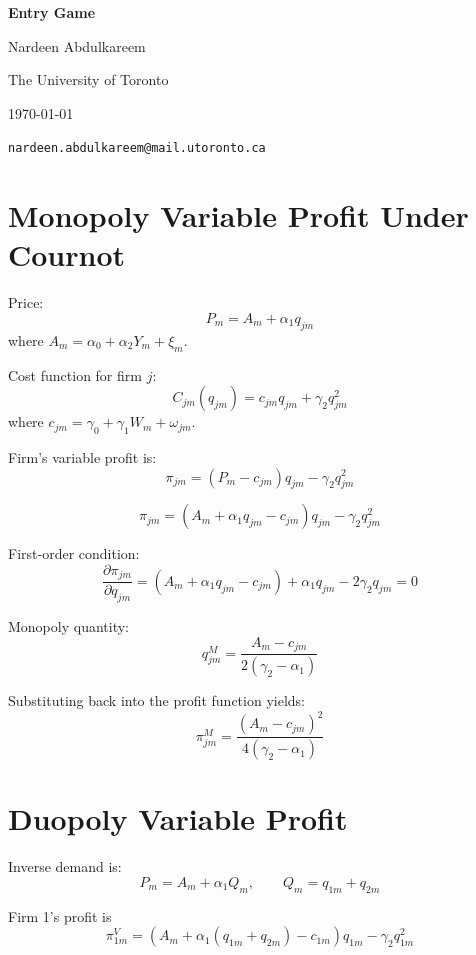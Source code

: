 \documentclass[12pt]{article}
\begin{document}
\begin{titlepage}
    \thispagestyle{empty} %
    \centering
    \vspace*{\fill}

    {\Large \textbf{Entry Game} \par}

    \vspace{3em}
    {\large Nardeen Abdulkareem \par}
    {\normalsize The University of Toronto \par}
    {\normalsize \today \par}
    {\texttt{nardeen.abdulkareem@mail.utoronto.ca} \par}

    \vspace*{\fill}
\end{titlepage}
\clearpage

\section{Monopoly Variable Profit Under Cournot}
Price:
\[
P_m = A_m + \alpha_1 q_{jm}
\]
where $A_m = \alpha_0 + \alpha_2 Y_m + \xi_m$.

Cost function for firm $j$:
\[
C_{jm}(q_{jm}) = c_{jm} q_{jm} + \gamma_2 q_{jm}^2
\]
where $c_{jm} = \gamma_0 + \gamma_1 W_m + \omega_{jm}$.

Firm’s variable profit is:
\[
\pi_{jm} = (P_m - c_{jm}) q_{jm} - \gamma_2 q_{jm}^2
\]

\[
\pi_{jm} = (A_m + \alpha_1 q_{jm} - c_{jm}) q_{jm} - \gamma_2 q_{jm}^2
\]

First-order condition:
\[
\frac{\partial \pi_{jm}}{\partial q_{jm}} = (A_m + \alpha_1 q_{jm} - c_{jm}) + \alpha_1 q_{jm} - 2\gamma_2q_{jm} = 0
\]

Monopoly quantity:
\[
q_{jm}^{M} = \frac{A_m - c_{jm}}{2(\gamma_2 - \alpha_1)}
\]

Substituting back into the profit function yields:
\[
\boxed{
\pi_{jm}^{M} = \frac{(A_m - c_{jm})^2}{4(\gamma_2 - \alpha_1)}
}
\]

\section{Duopoly Variable Profit}
Inverse demand is:
\[
P_m = A_m + \alpha_1 Q_m, \qquad Q_m = q_{1m} + q_{2m}
\]

Firm 1's profit is
\[
\pi_{1m}^V = \left(A_m + \alpha_1(q_{1m}+q_{2m}) - c_{1m}\right)q_{1m} - \gamma_2 q_{1m}^2
\]
\end{document}
